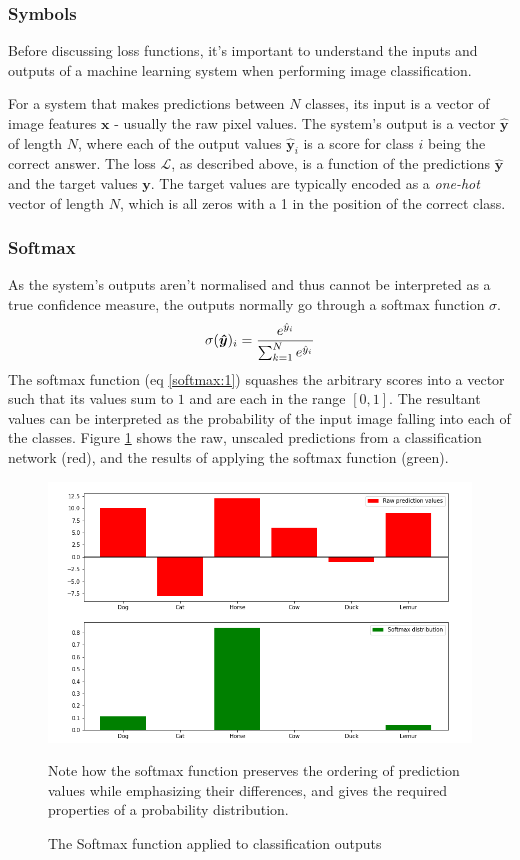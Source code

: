 \documentclass{report}
\begin{document}
	\subsubsection{Symbols}
	Before discussing loss functions, it's important to understand the inputs and outputs of a machine learning system when performing image classification. \par
	For a system that makes predictions between $N$ classes, its input is a vector of image features $\bm{x}$ - usually the raw pixel values. The system's output is a vector $\bm{\hat{y}}$ of length $N$, where each of the output values $\bm{\hat{y}}_i$ is a score for class $i$ being the correct answer. The loss $\mathcal{L}$, as described above, is a function of the predictions $\bm{\hat{y}}$ and the target values $\bm{y}$. The target values are typically encoded as a \textit{one-hot} vector of length $N$, which is all zeros with a 1 in the position of the correct class. \\
	
	\subsubsection{Softmax}
	As the system's outputs aren't normalised and thus cannot be interpreted as a true confidence measure, the outputs normally go through a softmax function $\sigma$.
	\begin{equation} \label{softmax:1}
	 \sigma(\bm{\hat{y}})_i = \frac{e^{\hat{y}_i}}{\sum_{k=1}^{N}e^{\hat{y}_i}} \\
	\end{equation}                                                              
	The softmax function (eq \ref{softmax:1}) squashes the arbitrary scores into a vector such that its values sum to $1$ and are each in the range $[0, 1]$. The resultant values can be interpreted as the probability of the input image falling into each of the classes. Figure \ref{fig:softmax:1} shows the raw, unscaled predictions from a classification network (red), and the results of applying the softmax function (green). \par
	\begin{figure}[h] 
		\centering
		\includegraphics[width=12cm]{softmaxplot}
		\caption{The Softmax function applied to classification outputs}
		Note how the softmax function preserves the ordering of prediction values while emphasizing their differences, and gives the required properties of a probability distribution.
		\label{fig:softmax:1}
	\end{figure}
	
\end{document}
